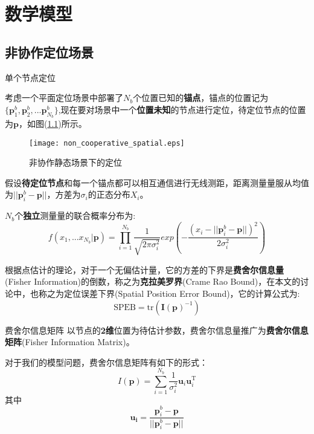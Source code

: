 \chapter{数学模型}\label{cha:model}
\section[非协作定位场景]{非协作定位场景}\label{section:noncooperative_localization}

{单个节点定位}

        考虑一个平面定位场景中部署了$N_b$个位置已知的\textbf{锚点}，锚点的位置记为$\{\bm{p}^b_1,\bm{p}^b_2,...\bm{p}^b_{N_b}\}$,现在要对场景中一个\textbf{位置未知}的节点进行定位，待定位节点的位置为$\bm{p}$，如图(\ref{fig:non_cooperative_spatial})所示。
        \begin{figure}
          \centering
        \texttt{[image: non\_cooperative\_spatial.eps]}
          \caption{非协作静态场景下的定位}\label{fig:non_cooperative_spatial}
        \end{figure}
假设\textbf{待定位节点}和每一个锚点都可以相互通信进行无线测距，距离测量量服从均值为$||\bm{p}^b_i-\bm{p}||$，方差为$\sigma_i$的正态分布$X_i$。

$N_b$个\textbf{独立}测量量的联合概率分布为:
\begin{equation}\label{eq:single}
f(x_1,...x_{N_b}|\textbf{p})=\prod_{i=1}^{N_b}\frac{1}{\sqrt{2\pi\sigma_i^2}}exp\left(-\frac{(x_i-||\bm{p}^b_i-\bm{p}||)^2}{2\sigma_i^2}\right)
\end{equation}

根据点估计的理论，对于一个无偏估计量，它的方差的下界是\textbf{费舍尔信息量}(Fisher Information)的倒数，称之为\textbf{克拉美罗界}(Crame Rao Bound)，在本文的讨论中，也称之为定位误差下界(Spatial Position Error Bound)，它的计算公式为:
\begin{equation}\label{eq:SPEB_formula}
  \text{SPEB}=\text{tr}(\bm{I(\bm{p})}^{-1})
\end{equation}


{费舍尔信息矩阵}
以节点的\textbf{2维}位置为待估计参数，费舍尔信息量推广为\textbf{费舍尔信息矩阵}(Fisher Information Matrix)。

对于我们的模型问题，费舍尔信息矩阵有如下的形式：
\begin{equation}\label{eq:uu}
I(\bm{p})=\displaystyle\sum_{i=1}^{N_b}\frac{1}{\sigma_i^2}\bm{u}_i\bm{u}_i^{\textrm{T}}
\end{equation}
其中
\begin{equation}
\bm{u_i}=\frac{\bm{p}^b_i-\bm{p}}{||\bm{p}^b_i-\bm{p}||}
\end{equation}


